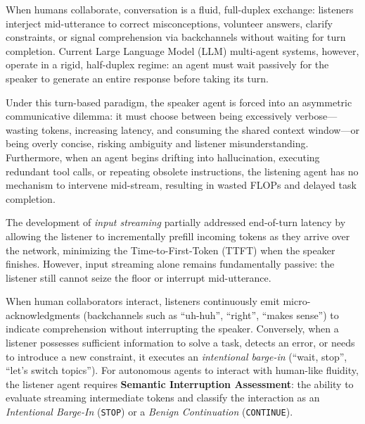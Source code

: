 \documentclass{article}
\begin{document}
When humans collaborate, conversation is a fluid, full-duplex exchange: listeners interject mid-utterance to correct misconceptions, volunteer answers, clarify constraints, or signal comprehension via backchannels without waiting for turn completion. Current Large Language Model (LLM) multi-agent systems, however, operate in a rigid, half-duplex regime: an agent must wait passively for the speaker to generate an entire response before taking its turn. 

Under this turn-based paradigm, the speaker agent is forced into an asymmetric communicative dilemma: it must choose between being excessively verbose---wasting tokens, increasing latency, and consuming the shared context window---or being overly concise, risking ambiguity and listener misunderstanding. Furthermore, when an agent begins drifting into hallucination, executing redundant tool calls, or repeating obsolete instructions, the listening agent has no mechanism to intervene mid-stream, resulting in wasted FLOPs and delayed task completion.

The development of \textit{input streaming} partially addressed end-of-turn latency by allowing the listener to incrementally prefill incoming tokens as they arrive over the network, minimizing the Time-to-First-Token (TTFT) when the speaker finishes. However, input streaming alone remains fundamentally passive: the listener still cannot seize the floor or interrupt mid-utterance.

When human collaborators interact, listeners continuously emit micro-acknowledgments (backchannels such as ``uh-huh'', ``right'', ``makes sense'') to indicate comprehension without interrupting the speaker. Conversely, when a listener possesses sufficient information to solve a task, detects an error, or needs to introduce a new constraint, it executes an \textit{intentional barge-in} (``wait, stop'', ``let's switch topics''). For autonomous agents to interact with human-like fluidity, the listener agent requires \textbf{Semantic Interruption Assessment}: the ability to evaluate streaming intermediate tokens and classify the interaction as an \textit{Intentional Barge-In} (\texttt{STOP}) or a \textit{Benign Continuation} (\texttt{CONTINUE}).
\end{document}
